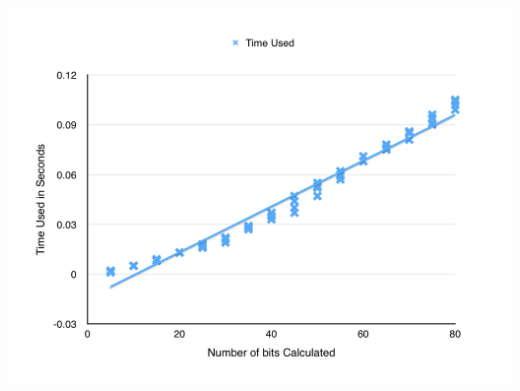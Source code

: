 \documentclass[12pt,twoside,notitlepage]{report}
\begin{document}
\includegraphics [width=\textwidth] {addres}
\end{document}
